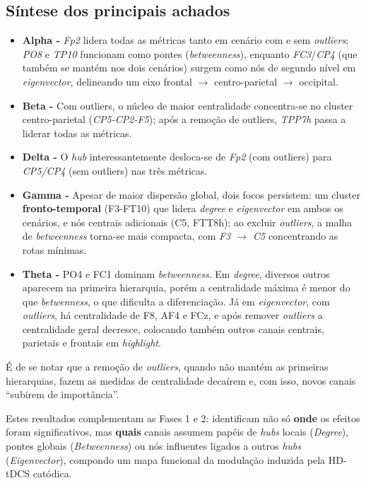 \subsection*{Síntese dos principais achados}
\begin{itemize}
    \item \textbf{Alpha -} \textit{Fp2} lidera todas as métricas tanto em cenário com e sem \textit{outliers}; \textit{PO8} e \textit{TP10} funcionam como pontes (\textit{betweenness}), enquanto \textit{FC3}/\textit{CP4}  (que também se mantém nos dois cenários) surgem como nós de segundo nível em \textit{eigenvector}, delineando um eixo frontal $\rightarrow$ centro-parietal $\rightarrow$ occipital.
    \item \textbf{Beta -} Com outliers, o núcleo de maior centralidade concentra-se no cluster centro-parietal (\textit{CP5-CP2-F5}); após a remoção de outliers, \textit{TPP7h} passa a liderar todas as métricas.
    \item \textbf{Delta -} O \textit{hub} interessantemente desloca-se de \textit{Fp2} (com outliers) para \textit{CP5/CP4} (sem outliers) nas três métricas.
    \item \textbf{Gamma -} Apesar de maior dispersão global, dois focos persistem: um cluster \textbf{fronto-temporal} (F3-FT10) que lidera \textit{degree} e \textit{eigenvector} em ambos os cenários, e nós centrais adicionais (C5, FTT8h); ao excluir \textit{outliers}, a malha de \textit{betweenness} torna-se mais compacta, com \textit{F3 $\rightarrow$ C5} concentrando as rotas mínimas.
    \item \textbf{Theta -} PO4 e FC1 dominam \textit{betweenness}. Em \textit{degree}, diversos outros aparecem na primeira hierarquia, porém a centralidade máxima é menor do que \textit{betwenness}, o que dificulta a diferenciação. Já em \textit{eigenvector}, com \textit{outliers}, há centralidade de F8, AF4 e FCz, e após remover \textit{outliers} a centralidade geral decresce, colocando também outros canais centrais, parietais e frontais em \textit{highlight}.
\end{itemize}

É de se notar que a remoção de \textit{outliers}, quando não mantém as primeiras hierarquias, fazem as medidas de centralidade decaírem e, com isso, novos canais ``subirem de importância''.

Estes resultados complementam as Fases 1 e 2: identificam não só \textbf{onde} os efeitos foram significativos, mas \textbf{quais} canais assumem papéis de \textit{hubs} locais (\textit{Degree}), pontes globais (\textit{Betweenness}) ou nós influentes ligados a outros \textit{hubs} (\textit{Eigenvector}), compondo um mapa funcional da modulação induzida pela HD-tDCS catódica.

